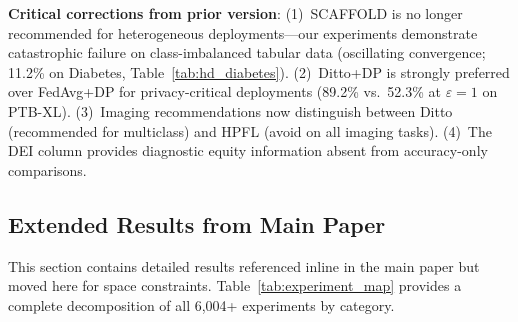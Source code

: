 \documentclass[conference]{IEEEtran}
\begin{document}
\textbf{Critical corrections from prior version}: (1)~SCAFFOLD is no longer recommended for heterogeneous deployments---our experiments demonstrate catastrophic failure on class-imbalanced tabular data (oscillating convergence; 11.2\% on Diabetes, Table~\ref{tab:hd_diabetes}). (2)~Ditto+DP is strongly preferred over FedAvg+DP for privacy-critical deployments (89.2\% vs.\ 52.3\% at $\varepsilon{=}1$ on PTB-XL). (3)~Imaging recommendations now distinguish between Ditto (recommended for multiclass) and HPFL (avoid on all imaging tasks). (4)~The DEI column provides diagnostic equity information absent from accuracy-only comparisons.


\subsection{Extended Results from Main Paper}
\label{sec:main_extended}

This section contains detailed results referenced inline in the main paper but moved here for space constraints. Table~\ref{tab:experiment_map} provides a complete decomposition of all 6,004+ experiments by category.
\end{document}
